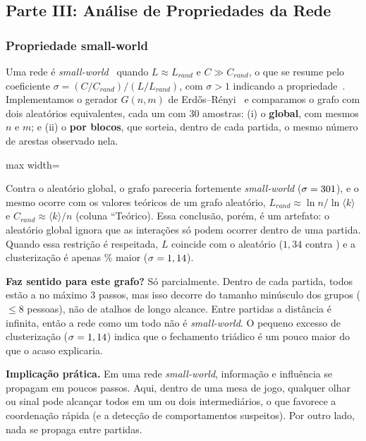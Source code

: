 \documentclass[sigconf]{webmedia}
\begin{document}
\subsection{Parte III: Análise de Propriedades da Rede}

\subsubsection{Propriedade small-world}
Uma rede é \textit{small-world}~\cite{watts} quando $L \approx L_{rand}$ e $C \gg C_{rand}$, o que se resume pelo coeficiente $\sigma = (C/C_{rand})/(L/L_{rand})$, com $\sigma > 1$ indicando a propriedade~\cite{humphries2008}. Implementamos o gerador $G(n,m)$ de Erdős–Rényi~\cite{erdos1959} e comparamos o grafo com dois aleatórios equivalentes, cada um com 30 amostras: (i) o \textbf{global}, com mesmos $n$ e $m$; e (ii) o \textbf{por blocos}, que sorteia, dentro de cada partida, o mesmo número de arestas observado nela.

\begin{table}[h]
  \caption{Comparação com grafos aleatórios equivalentes (média de 30 amostras).}
  \label{tab:sw}
  \begin{adjustbox}{max width=\columnwidth}
  
  \end{adjustbox}
\end{table}

Contra o aleatório global, o grafo pareceria fortemente \textit{small-world} ($\sigma = 301$), e o mesmo ocorre com os valores teóricos de um grafo aleatório, $L_{rand} \approx \ln n / \ln \langle k \rangle$ e $C_{rand} \approx \langle k \rangle / n$ (coluna ``Teórico). Essa conclusão, porém, é um artefato: o aleatório global ignora que as interações só podem ocorrer dentro de uma partida. Quando essa restrição é respeitada, $L$ coincide com o aleatório ($1{,}34$ contra \LBlocos) e a clusterização é apenas \excessoC\% maior ($\sigma = 1,14$).

\textbf{Faz sentido para este grafo?} Só parcialmente. Dentro de cada partida, todos estão a no máximo 3 passos, mas isso decorre do tamanho minúsculo dos grupos ($\leq 8$ pessoas), não de atalhos de longo alcance. Entre partidas a distância é infinita, então a rede como um todo não é \textit{small-world}. O pequeno excesso de clusterização ($\sigma = 1,14$) indica que o fechamento triádico é um pouco maior do que o acaso explicaria.

\textbf{Implicação prática.} Em uma rede \textit{small-world}, informação e influência se propagam em poucos passos. Aqui, dentro de uma mesa de jogo, qualquer olhar ou sinal pode alcançar todos em um ou dois intermediários, o que favorece a coordenação rápida (e a detecção de comportamentos suspeitos). Por outro lado, nada se propaga entre partidas.
\end{document}
